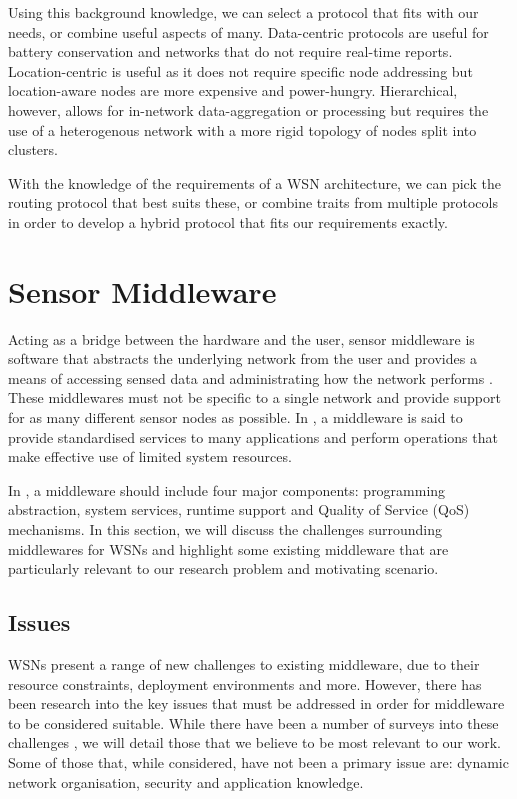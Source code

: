 Using this background knowledge, we can select a protocol that fits with our needs, or combine useful aspects of many. Data-centric protocols are useful for battery conservation and networks that do not require real-time reports. Location-centric is useful as it does not require specific node addressing but location-aware nodes are more expensive and power-hungry. Hierarchical, however, allows for in-network data-aggregation or processing but requires the use of a heterogenous network with a more rigid topology of nodes split into clusters.

With the knowledge of the requirements of a WSN architecture, we can pick the routing protocol that best suits these, or combine traits from multiple protocols in order to develop a hybrid protocol that fits our requirements exactly.
\section{Sensor Middleware} \label{bg:sm}
	Acting as a bridge between the hardware and the user, sensor middleware is software that abstracts the underlying network from the user and provides a means of accessing sensed data and administrating how the network performs \cite{Hadim2006}. These middlewares must not be specific to a single network and provide support for as many different sensor nodes as possible. In \cite{Yu2004}, a middleware is said to provide standardised services to many applications and perform operations that make effective use of limited system resources.

	In \cite{Wang2008c}, a middleware should include four major components: programming abstraction, system services, runtime support and Quality of Service (QoS) mechanisms. In this section, we will discuss the challenges surrounding middlewares for WSNs and highlight some existing middleware that are particularly relevant to our research problem and motivating scenario.

\subsection{Issues}\label{bg:sm:issues}
	WSNs present a range of new challenges to existing middleware, due to their resource constraints, deployment environments and more. However, there has been research into the key issues that must be addressed in order for middleware to be considered suitable.
	While there have been a number of surveys into these challenges \cite{Hadim2006, Rahman, Yu2004}, we will detail those that we believe to be most relevant to our work. Some of those that, while considered, have not been a primary issue are: dynamic network organisation, security and application knowledge.
